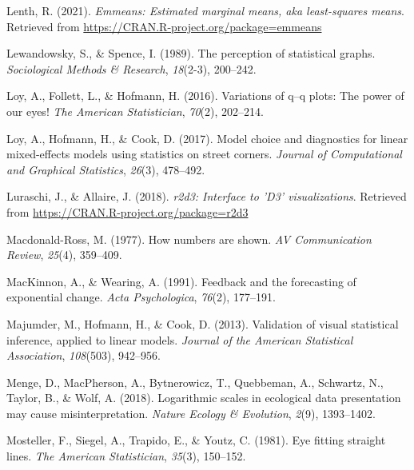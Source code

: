 \documentclass[print]{nuthesis}
\newlength{\cslhangindent}
\newenvironment{CSLReferences}[2]%
{\setlength{\parindent}{0pt}%
\everypar{\setlength{\hangindent}{\cslhangindent}}\ignorespaces}%
{\par}
\begin{document}
\begin{CSLReferences}{1}{0}
\leavevmode{}%
Lenth, R. (2021). \emph{Emmeans: Estimated marginal means, aka least-squares means}. Retrieved from \url{https://CRAN.R-project.org/package=emmeans}

\leavevmode{}%
Lewandowsky, S., \& Spence, I. (1989). The perception of statistical graphs. \emph{Sociological Methods \& Research}, \emph{18}(2-3), 200--242.

\leavevmode{}%
Loy, A., Follett, L., \& Hofmann, H. (2016). Variations of q--q plots: The power of our eyes! \emph{The American Statistician}, \emph{70}(2), 202--214.

\leavevmode{}%
Loy, A., Hofmann, H., \& Cook, D. (2017). Model choice and diagnostics for linear mixed-effects models using statistics on street corners. \emph{Journal of Computational and Graphical Statistics}, \emph{26}(3), 478--492.

\leavevmode{}%
Luraschi, J., \& Allaire, J. (2018). \emph{r2d3: Interface to 'D3' visualizations}. Retrieved from \url{https://CRAN.R-project.org/package=r2d3}

\leavevmode{}%
Macdonald-Ross, M. (1977). How numbers are shown. \emph{AV Communication Review}, \emph{25}(4), 359--409.

\leavevmode{}%
MacKinnon, A., \& Wearing, A. (1991). Feedback and the forecasting of exponential change. \emph{Acta Psychologica}, \emph{76}(2), 177--191.

\leavevmode{}%
Majumder, M., Hofmann, H., \& Cook, D. (2013). Validation of visual statistical inference, applied to linear models. \emph{Journal of the American Statistical Association}, \emph{108}(503), 942--956.

\leavevmode{}%
Menge, D., MacPherson, A., Bytnerowicz, T., Quebbeman, A., Schwartz, N., Taylor, B., \& Wolf, A. (2018). Logarithmic scales in ecological data presentation may cause misinterpretation. \emph{Nature Ecology \& Evolution}, \emph{2}(9), 1393--1402.

\leavevmode{}%
Mosteller, F., Siegel, A., Trapido, E., \& Youtz, C. (1981). Eye fitting straight lines. \emph{The American Statistician}, \emph{35}(3), 150--152.


\end{CSLReferences}
\end{document}

